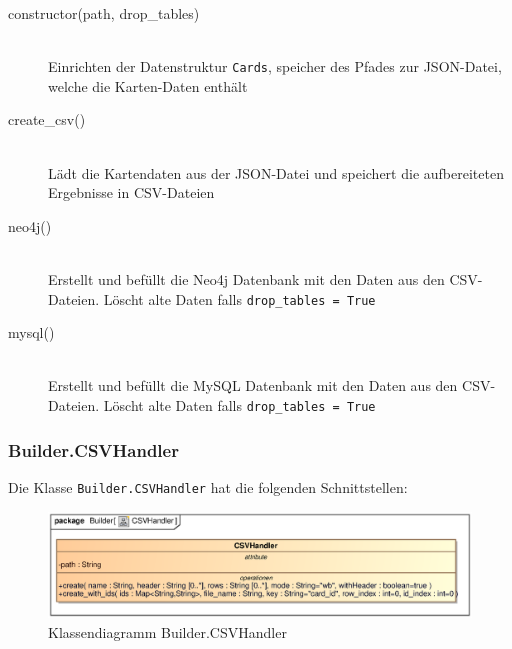 \begin{description}
    \item[constructor(path, drop\_tables)] \hfill \\
    Einrichten der Datenstruktur \verb|Cards|, speicher des Pfades zur \ac{JSON}-Datei, welche die Karten-Daten enthält
    
    \item[create\_csv()] \hfill \\
    Lädt die Kartendaten aus der \ac{JSON}-Datei und speichert die aufbereiteten Ergebnisse in \ac{CSV}-Dateien
    
    \item[neo4j()] \hfill \\
    Erstellt und befüllt die Neo4j Datenbank mit den Daten aus den \ac{CSV}-Dateien. Löscht alte Daten falls \verb|drop_tables = True|
    
    \item[mysql()] \hfill \\
    Erstellt und befüllt die MySQL Datenbank mit den Daten aus den \ac{CSV}-Dateien. Löscht alte Daten falls \verb|drop_tables = True|
\end{description}

\subsubsection{Builder.CSVHandler}
Die Klasse \verb|Builder.CSVHandler| hat die folgenden Schnittstellen:

\begin{figure}[H]
    \myfloatalign
    \includegraphics[width=\textwidth]{gfx/MtGDeepAnalysis/CSVHandler.eps}
    \caption{Klassendiagramm Builder.CSVHandler}
    \label{fig:class:builder.CSVHandler}
\end{figure}

